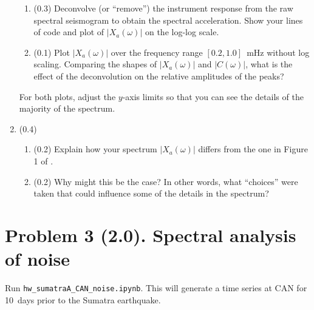 \documentclass[11pt,titlepage,fleqn]{article}
\newcommand{\tfilenoise}{{\tt hw\_sumatraA\_CAN\_noise.ipynb}}
\begin{document}
\begin{enumerate}
\begin{enumerate}
\item (0.3) Deconvolve (or ``remove'') the instrument response from the raw spectral seismogram to obtain the spectral acceleration. Show your lines of code and plot of $|X_a(\omega)|$ on the log-log scale.
\item (0.1) Plot $|X_a(\omega)|$ over the frequency range $[0.2,1.0]$~mHz without log scaling. Comparing the shapes of $|X_a(\omega)|$ and $|C(\omega)|$, what is the effect of the deconvolution on the relative amplitudes of the peaks?
\end{enumerate}
%
For both plots, adjust the $y$-axis limits so that you can see the details of the majority of the spectrum.


\item (0.4) \ptag\ 
%
\begin{enumerate}
\item (0.2) Explain how your spectrum $|X_a(\omega)|$ differs from the one in Figure 1 of \citet{Park2005}.
\item (0.2) Why might this be the case? In other words, what ``choices'' were taken that could influence some of the details in the spectrum?
\end{enumerate}

\end{enumerate}


\section*{Problem 3 (2.0). Spectral analysis of noise}

Run \tfilenoise. This will generate a time series at CAN for 10~days prior to the Sumatra earthquake.
\end{document}

